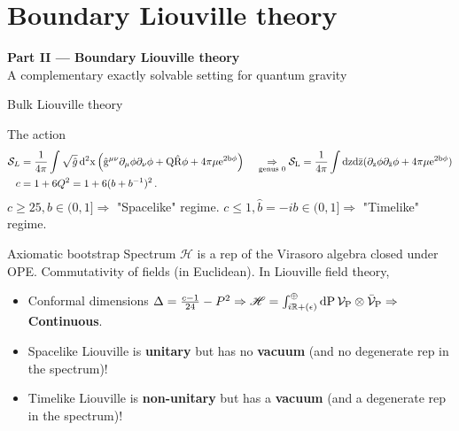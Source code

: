\documentclass[aspectratio=169,smaller]{beamer}%
\begin{document}
\section{Boundary Liouville theory}

\begin{frame}[plain]
  \centering
  {\Large\textbf{Part II --- Boundary Liouville theory}}\\[0.6cm]
  {\normalsize A complementary exactly solvable setting for quantum gravity}
\end{frame}

\begin{frame}{Bulk Liouville theory}
	\vspace{-0.5cm}
	\begin{block}{The action}
		\begin{equation*}
		\begin{aligned}
			\mathcal{S}_L &= \frac{1}{4\pi}\int \sqrt{\hat{g}}\, \rm{d}^2x\left(\hat{g}^{\mu \nu} \partial_\mu \phi \partial_\nu \phi + Q \hat{R}\phi + 4\pi \mu e^{2b\phi}\right)\, \quad \underset{\text{genus } 0}{\Rightarrow} \mathcal{S}_L = \frac{1}{4\pi}\int \rm{d}z \rm{d}\bar{z}(\partial_z\phi\partial_{\bar{z}}\phi+ 4\pi \mu e^{2b\phi})\\
			c &= 1+ 6Q^2 = 1 + 6(b+b^{-1})^2\,.
		\end{aligned}
		\end{equation*}
		$c\geq25, b \in (0,1] \Rightarrow$ "Spacelike" regime. 
		$c\leq1, \hat{b}=-ib \in (0,1] \Rightarrow$ "Timelike" regime.
	\end{block}
	\pause
	\begin{block}{Axiomatic bootstrap}
	Spectrum $\mathscr{H}$ is a rep of the Virasoro algebra closed under OPE. Commutativity of fields (in Euclidean). In Liouville field theory,
	\begin{itemize}
		\item Conformal dimensions $\Delta = \frac{c-1}{24}-P^2 \Rightarrow \mathscr{H} = \int_{i\mathbb{R}+(\epsilon)}^{\oplus} \rm{d}P\,\mathcal{V}_{P}\otimes \bar{\mathcal{V}}_{P} \Rightarrow$ \textbf{Continuous}.
		\item Spacelike Liouville is \textbf{unitary} but has no \textbf{vacuum} (and no degenerate rep in the spectrum)!
		\item Timelike Liouville is \textbf{non-unitary} but has a \textbf{vacuum} (and a degenerate rep in the spectrum)!
	\end{itemize}
	\end{block}
\end{frame}
\end{document}
